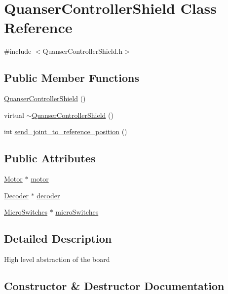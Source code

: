 \hypertarget{classQuanserControllerShield}{}\section{Quanser\+Controller\+Shield Class Reference}
\label{classQuanserControllerShield}


{\ttfamily \#include $<$Quanser\+Controller\+Shield.\+h$>$}

\subsection*{Public Member Functions}
\begin{DoxyCompactItemize}
\item 
\mbox{\hyperlink{classQuanserControllerShield_a965410baa27ff59baa08bf1e49a7f1eb}{Quanser\+Controller\+Shield}} ()
\item 
virtual \mbox{\hyperlink{classQuanserControllerShield_a60b539f19bf54838086557c8c3e7a1bb}{$\sim$\+Quanser\+Controller\+Shield}} ()
\item 
int \mbox{\hyperlink{classQuanserControllerShield_acc48f947e7646699383b8ff786a71f22}{send\+\_\+joint\+\_\+to\+\_\+reference\+\_\+position}} ()
\end{DoxyCompactItemize}
\subsection*{Public Attributes}
\begin{DoxyCompactItemize}
\item 
\mbox{\hyperlink{classMotor}{Motor}} $\ast$ \mbox{\hyperlink{classQuanserControllerShield_a7b7642fc075d425ff9ee43909b992f94}{motor}}
\item 
\mbox{\hyperlink{classDecoder}{Decoder}} $\ast$ \mbox{\hyperlink{classQuanserControllerShield_a83088510efc04475115e835a65a4b9ad}{decoder}}
\item 
\mbox{\hyperlink{classMicroSwitches}{Micro\+Switches}} $\ast$ \mbox{\hyperlink{classQuanserControllerShield_a3e52e8fda734c41da7ad6f704ccf0877}{micro\+Switches}}
\end{DoxyCompactItemize}


\subsection{Detailed Description}
High level abstraction of the board 

\subsection{Constructor \& Destructor Documentation}
\mbox{\label{classQuanserControllerShield_a965410baa27ff59baa08bf1e49a7f1eb}} 
